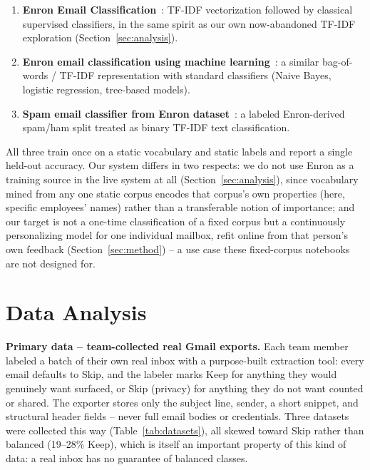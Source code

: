 \documentclass[twoside,twocolumn,10pt]{article}
\begin{document}
\begin{enumerate}
\item \textbf{Enron Email Classification}~\cite{adrian_enron_kaggle}: TF-IDF vectorization followed by classical supervised classifiers, in the same spirit as our own now-abandoned TF-IDF exploration (Section~\ref{sec:analysis}).
\item \textbf{Enron email classification using machine learning}~\cite{ankur_enron_kaggle}: a similar bag-of-words / TF-IDF representation with standard classifiers (Naive Bayes, logistic regression, tree-based models).
\item \textbf{Spam email classifier from Enron dataset}~\cite{solano_enron_kaggle}: a labeled Enron-derived spam/ham split treated as binary TF-IDF text classification.
\end{enumerate}

All three train once on a static vocabulary and static labels and report a single held-out accuracy. Our system differs in two respects: we do not use Enron as a training source in the live system at all (Section~\ref{sec:analysis}), since vocabulary mined from any one static corpus encodes that corpus's own properties (here, specific employees' names) rather than a transferable notion of importance; and our target is not a one-time classification of a fixed corpus but a continuously personalizing model for one individual mailbox, refit online from that person's own feedback (Section~\ref{sec:method}) -- a use case these fixed-corpus notebooks are not designed for.

\section{Data Analysis}
\label{sec:data}

\textbf{Primary data -- team-collected real Gmail exports.} Each team member labeled a batch of their own real inbox with a purpose-built extraction tool: every email defaults to Skip, and the labeler marks Keep for anything they would genuinely want surfaced, or Skip (privacy) for anything they do not want counted or shared. The exporter stores only the subject line, sender, a short snippet, and structural header fields -- never full email bodies or credentials. Three datasets were collected this way (Table~\ref{tab:datasets}), all skewed toward Skip rather than balanced (19--28\% Keep), which is itself an important property of this kind of data: a real inbox has no guarantee of balanced classes.

\begin{table}[h]
\centering
\caption{Team-collected real Gmail datasets.}
\label{tab:datasets}
\end{table}
\end{document}
